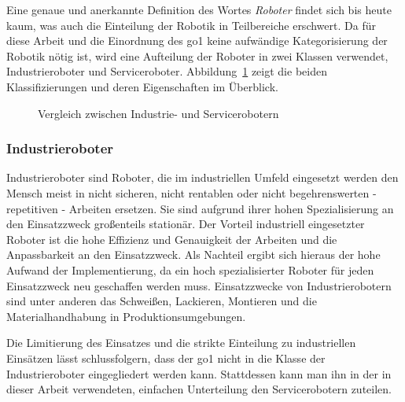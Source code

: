 Eine genaue und anerkannte Definition des Wortes \emph{Roboter} findet sich bis heute kaum, was auch die Einteilung der Robotik
in Teilbereiche erschwert.
Da für diese Arbeit und die Einordnung des \gls{go1} keine aufwändige Kategorisierung der Robotik nötig ist,
wird eine Aufteilung der Roboter in zwei Klassen verwendet, Industrieroboter und Serviceroboter.
Abbildung~\ref{fig:industrie_vs_service} zeigt die beiden Klassifizierungen und deren Eigenschaften im Überblick.

\begin{figure}[h]
    \caption[Vergleich zwischen Industrie- und Servicerobotern]{Vergleich zwischen Industrie- und Servicerobotern\footnotemark}\label{fig:industrie_vs_service}
\end{figure}

\subsubsection{Industrieroboter}

Industrieroboter sind Roboter, die im industriellen Umfeld eingesetzt werden den Mensch meist in nicht sicheren,
nicht rentablen oder nicht begehrenswerten - repetitiven - Arbeiten ersetzen.
Sie sind aufgrund ihrer hohen Spezialisierung an den Einsatzzweck großenteils stationär.
Der Vorteil industriell eingesetzter Roboter ist die hohe Effizienz und Genauigkeit der Arbeiten und die Anpassbarkeit an
den Einsatzzweck.
Als Nachteil ergibt sich hieraus der hohe Aufwand der Implementierung, da ein hoch spezialisierter Roboter für jeden
Einsatzzweck neu geschaffen werden muss.
Einsatzzwecke von Industrierobotern sind unter anderen das Schweißen, Lackieren, Montieren und die Materialhandhabung in
Produktionsumgebungen.

Die Limitierung des Einsatzes und die strikte Einteilung zu industriellen Einsätzen lässt schlussfolgern, dass der \gls{go1}
nicht in die Klasse der Industrieroboter eingegliedert werden kann.
Stattdessen kann man ihn in der in dieser Arbeit verwendeten, einfachen Unterteilung den Servicerobotern zuteilen.


